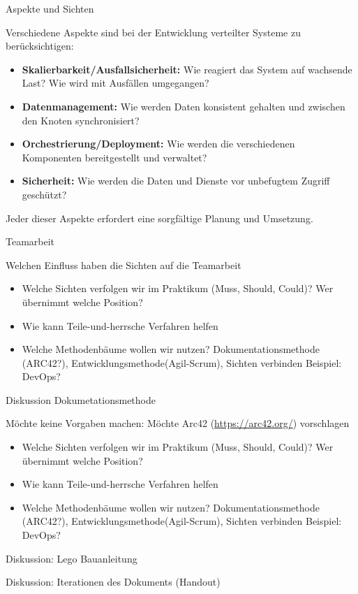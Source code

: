 \documentclass{beamer}
\begin{document}
\begin{frame}{Aspekte und Sichten}

    Verschiedene Aspekte sind bei der Entwicklung verteilter Systeme zu berücksichtigen:

    \begin{itemize}
        \item \textbf{Skalierbarkeit/Ausfallsicherheit:}  Wie reagiert das System auf wachsende Last? Wie wird mit Ausfällen umgegangen?
        \item \textbf{Datenmanagement:} Wie werden Daten konsistent gehalten und zwischen den Knoten synchronisiert?
        \item \textbf{Orchestrierung/Deployment:} Wie werden die verschiedenen Komponenten bereitgestellt und verwaltet?
        \item \textbf{Sicherheit:} Wie werden die Daten und Dienste vor unbefugtem Zugriff geschützt?
    \end{itemize}

    Jeder dieser Aspekte erfordert eine sorgfältige Planung und Umsetzung.

\end{frame}


\begin{frame}{Teamarbeit}

  Welchen Einfluss haben die Sichten auf die Teamarbeit

    \begin{itemize}
        \item Welche Sichten verfolgen wir im Praktikum (Muss, Should, Could)? Wer übernimmt welche Position?
        \item Wie kann Teile-und-herrsche Verfahren helfen
        \item Welche Methodenbäume wollen wir nutzen? Dokumentationsmethode (ARC42?), Entwicklungsmethode(Agil-Scrum), Sichten verbinden Beispiel: DevOps?
    \end{itemize}

\end{frame}


\begin{frame}{Diskussion Dokumetationsmethode}

  Möchte keine Vorgaben machen: Möchte Arc42 (\url{https://arc42.org/}) vorschlagen 

    \begin{itemize}
        \item Welche Sichten verfolgen wir im Praktikum (Muss, Should, Could)? Wer übernimmt welche Position?
        \item Wie kann Teile-und-herrsche Verfahren helfen
        \item Welche Methodenbäume wollen wir nutzen? Dokumentationsmethode (ARC42?), Entwicklungsmethode(Agil-Scrum), Sichten verbinden Beispiel: DevOps?
    \end{itemize}
    Diskussion: Lego Bauanleitung

    Diskussion: Iterationen des Dokuments (Handout)
\end{frame}
\end{document}
